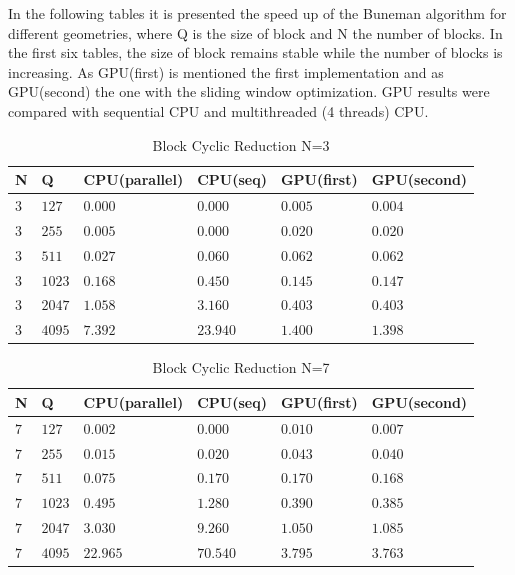 In the following tables it is presented the speed up of the Buneman algorithm for different geometries, where Q is the size of block and N the number of blocks. In the first six tables, the size of block remains stable while the number of blocks is increasing. As GPU(first) is mentioned the first implementation and as GPU(second) the one with the sliding window optimization. GPU results were compared with sequential CPU and multithreaded (4 threads) CPU.  

\newpage
    \begin{table}[H]
\caption{Block Cyclic Reduction N=3} 
\centering 
\begin{tabular}{| l |  p{1cm} |p{}| p{} |  p{}| p{}  |} 
\hline\hline 
N & Q & CPU(parallel) & CPU(seq) & GPU(first)  & GPU(second) \\ [0.8ex] 
\hline 
$3$ &	$127$ & $0.000$	& $0.000$ & $0.005$ &  $0.004$ \\
$3$ &	$255$ & $0.005$	&	$0.000$ & $0.020$ & $0.020$ \\
$3$ &	$511$ & $0.027$	&	$0.060$ & $0.062$ & $0.062$ \\
$3$ &	$1023$ & $0.168$	&	$0.450$ & $0.145$ & $0.147$ \\
$3$ &	$2047$ & $1.058$	&	$3.160$ & $0.403$ & $0.403$ \\
$3$ &	$4095$ & $7.392$	&	$23.940$ & $1.400$ & $1.398$ \\[1ex]
\hline 
\end{tabular}
\label{table:bcr_n=3} 
\end{table}

\begin{table}[H]
\caption{Block Cyclic Reduction N=7} 
\centering 
\begin{tabular}{| l |  p{1cm} |p{}| p{} |  p{}| p{}  |} 
\hline\hline 
N & Q & CPU(parallel) & CPU(seq) & GPU(first)  & GPU(second)\\ [0.8ex] 
\hline
$7$ &	$127$ & $0.002$	&	$0.000$ & $0.010$ & $0.007$ \\
$7$ &	$255$ & $0.015$	&	$0.020$ & $0.043$ & $0.040$ \\
$7$ &	$511$ & $0.075$	&	$0.170$ & $0.170$ & $0.168$ \\
$7$ &	$1023$ & $0.495$	&	$1.280$ & $0.390$ & $0.385$ \\
$7$ &	$2047$ & $3.030$	&	$9.260$ & $1.050$ & $1.085$ \\
$7$ &	$4095$ & $22.965$	&	$70.540$ & $3.795$ & $3.763$ \\[1ex]
\hline 
\end{tabular}
\label{table:bcr_n=7} 
\end{table}

